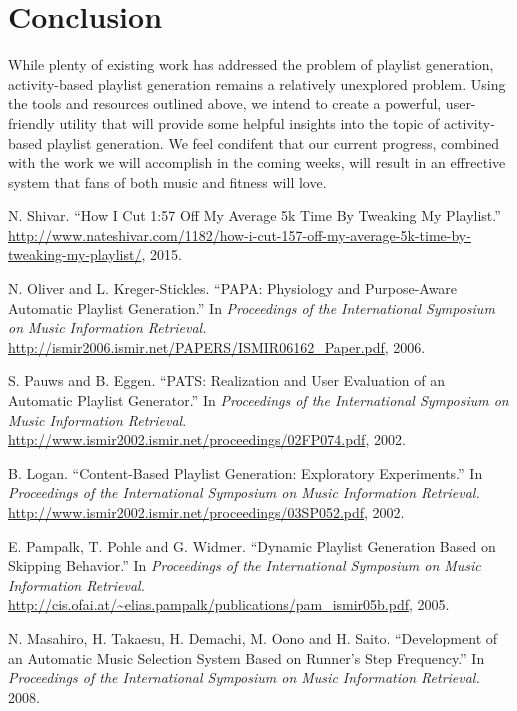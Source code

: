 \documentclass{article}
\begin{document}
\section{Conclusion}
While plenty of existing work has addressed the problem of playlist generation, activity-based playlist generation remains a relatively unexplored problem. Using the tools and resources outlined above, we intend to create a powerful, user-friendly utility that will provide some helpful insights into the topic of activity-based playlist generation. We feel condifent that our current progress, combined with the work we will accomplish in the coming weeks, will result in an effrective system that fans of both music and fitness will love. 

\begin{thebibliography}{cites}
\raggedright
{}
N. Shivar. ``How I Cut 1:57 Off My Average 5k Time By Tweaking My Playlist.'' \url{http://www.nateshivar.com/1182/how-i-cut-157-off-my-average-5k-time-by-tweaking-my-playlist/}, 2015.

N. Oliver and L. Kreger-Stickles. ``PAPA: Physiology and Purpose-­Aware Automatic Playlist Generation.'' In {\it Proceedings of the International Symposium on Music Information Retrieval.} \url{http://ismir2006.ismir.net/PAPERS/ISMIR06162_Paper.pdf}, 2006.

S. Pauws and B. Eggen. ``PATS: Realization and User Evaluation of an Automatic Playlist Generator.'' In {\it Proceedings of the International Symposium on Music Information Retrieval}. \url{http://www.ismir2002.ismir.net/proceedings/02FP074.pdf}, 2002.

B. Logan. ``Content-­Based Playlist Generation: Exploratory Experiments.'' In {\it Proceedings of the International Symposium on Music Information Retrieval.} \url{http://www.ismir2002.ismir.net/proceedings/03SP052.pdf}, 2002.

E. Pampalk, T. Pohle and G. Widmer. ``Dynamic Playlist Generation Based on Skipping Behavior.'' In {\it Proceedings of the International Symposium on Music Information Retrieval.} \url{http://cis.ofai.at/~elias.pampalk/publications/pam_ismir05b.pdf}, 2005.

N. Masahiro, H. Takaesu, H. Demachi, M. Oono and H. Saito. ``Development of an Automatic Music Selection System Based on Runner’s Step Frequency.'' In {\it Proceedings of the International Symposium on Music Information Retrieval.} 2008.


\end{thebibliography}
\end{document}
